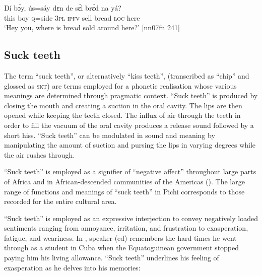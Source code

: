 \ea%
    \label{ex:key:1662}
    \gll Dí  bɔ́y, ús=sáy  dɛn  de  sɛ́l  brɛ́d    na  yá?\\
this  boy  \textsc{q=}side  \textsc{3pl}  \textsc{ipfv}  sell  bread  \textsc{loc}  here\\

\glt ‘Hey you, where is bread sold around here?’ [nn07fn 241]
\z

\subsection{Suck teeth}\label{sec:12.2.4}

The term “suck teeth”, or alternatively “kiss teeth”, (transcribed as “chip” and glossed as \textsc{skt}) are terms employed for a phonetic realisation whose various meanings are determined through pragmatic context. “Suck teeth” is produced by closing the mouth and creating a suction in the oral cavity. The lips are then opened while keeping the teeth closed. The influx of air through the teeth in order to fill the vacuum of the oral cavity produces a release sound followed by a short hiss. “Suck teeth” can be modulated in sound and meaning by manipulating the amount of suction and pursing the lips in varying degrees while the air rushes through. 


“Suck teeth” is employed as a signifier of “negative affect” \citep{Figueroa2005} throughout large parts of Africa and in African-descended communities of the Americas (\citealt{RickfordRickford1976}). The large range of functions and meanings of “suck teeth” in Pichi corresponds to those recorded for the entire cultural area.



“Suck teeth” is employed as an expressive interjection to convey negatively loaded sentiments ranging from annoyance, irritation, and frustration to exasperation, fatigue, and weariness. In , speaker (ed) remembers the hard times he went through as a student in Cuba when the Equatoguinean government stopped paying him his living allowance. “Suck teeth” underlines his feeling of exasperation as he delves into his memories: 



\ea%
    \label{ex:key:1663}
\z\z

